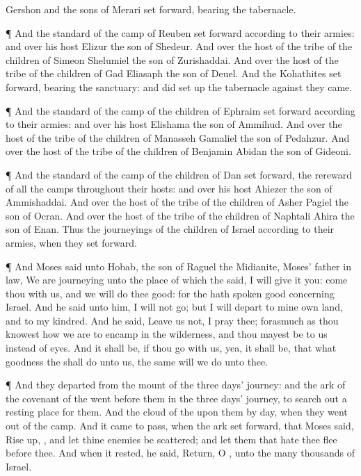 {Gershon and the
sons of
Merari set
forward,
bearing the
tabernacle.
\par }{\PP {}¶ And the
standard of the
camp of
Reuben set
forward according to their
armies: and over his
host
{}
Elizur the
son of
Shedeur.
And over the
host of the
tribe of the
children of
Simeon
{}
Shelumiel the
son of
Zurishaddai.
And over the
host of the
tribe of the
children of
Gad
{}
Eliasaph the
son of
Deuel.
And the
Kohathites set
forward,
bearing the
sanctuary: and
{} did set
up the
tabernacle against they
came.
\par }{\PP {}¶ And the
standard of the
camp of the
children of
Ephraim set
forward according to their
armies: and over his
host
{}
Elishama the
son of
Ammihud.
And over the
host of the
tribe of the
children of
Manasseh
{}
Gamaliel the
son of
Pedahzur.
And over the
host of the
tribe of the
children of
Benjamin
{}
Abidan the
son of
Gideoni.
\par }{\PP {}¶ And the
standard of the
camp of the
children of
Dan set
forward,
{} the
rereward of all the
camps throughout their
hosts: and over his
host
{}
Ahiezer the
son of
Ammishaddai.
And over the
host of the
tribe of the
children of
Asher
{}
Pagiel the
son of
Ocran.
And over the
host of the
tribe of the
children of
Naphtali
{}
Ahira the
son of
Enan.
Thus
{} the
journeyings of the
children of
Israel according to their
armies, when they set
forward.
\par }{\PP {}¶ And
Moses
said unto
Hobab, the
son of
Raguel the
Midianite,
Moses’ father in
law, We are
journeying unto the
place of which the
{}
said, I will
give it you:
come thou with us, and we will do thee
good: for the
{} hath
spoken
good concerning
Israel.
And he
said unto him, I will not
go; but I will
depart to mine own
land, and to my
kindred.
And he
said,
Leave us not, I pray thee; forasmuch as thou
knowest how we are to
encamp in the
wilderness, and thou mayest be to us instead of
eyes.
And it shall be, if thou
go with us, yea, it shall be, that what
goodness the
{} shall
do unto us, the same will we
do unto thee.
\par }{\PP {}¶ And they
departed from the
mount of the
{}
three
days’
journey: and the
ark of the
covenant of the
{}
went
before them in the
three
days’
journey, to search
out a resting
place for them.
And the
cloud of the
{}
{} upon them by
day, when they went
out of the
camp.
And it came to pass, when the
ark set
forward, that
Moses
said, Rise
up,
{}, and let thine
enemies be
scattered; and let them that
hate thee
flee
before thee.
And when it
rested, he
said,
Return, O
{}, unto the
many
thousands of
Israel.

}
